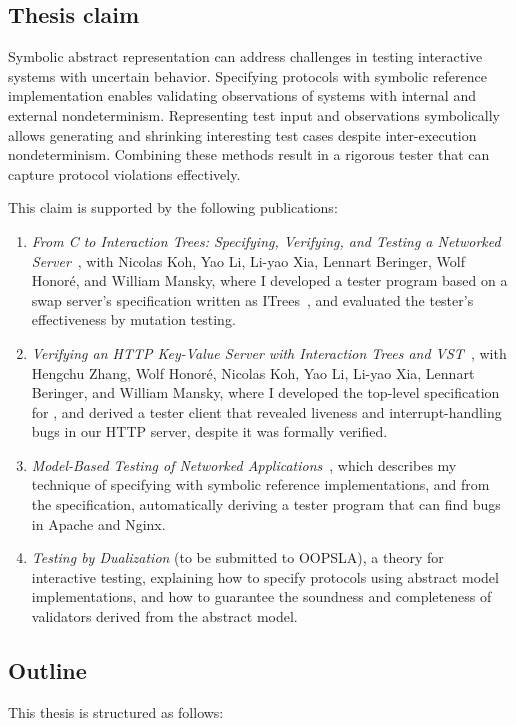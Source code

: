 \subsection*{Thesis claim}
Symbolic abstract representation can address challenges in testing interactive
systems with uncertain behavior.  Specifying protocols with symbolic reference
implementation enables validating observations of systems with internal and
external nondeterminism.  Representing test input and observations symbolically
allows generating and shrinking interesting test cases despite inter-execution
nondeterminism.  Combining these methods result in a rigorous tester that can
capture protocol violations effectively.

This claim is supported by the following publications:
\begin{enumerate}
\item {\it From C to Interaction Trees: Specifying, Verifying, and Testing a
  Networked Server}~\cite{cpp19}, with Nicolas Koh, Yao Li, Li-yao Xia, Lennart
  Beringer, Wolf Honor\'e, and William Mansky, where I developed a tester
  program based on a swap server's specification written as ITrees~\cite{itree},
  and evaluated the tester's effectiveness by mutation testing.
\item {\it Verifying an HTTP Key-Value Server with Interaction Trees and
  VST}~\cite{itp21}, with Hengchu Zhang, Wolf Honor\'e, Nicolas Koh, Yao Li,
  Li-yao Xia, Lennart Beringer, and William Mansky, where I developed the
  top-level specification for \http, and derived a tester client that revealed
  liveness and interrupt-handling bugs in our HTTP server, despite it was
  formally verified.
\item {\it Model-Based Testing of Networked Applications}~\cite{issta21}, which
  describes my technique of specifying \http with symbolic reference
  implementations, and from the specification, automatically deriving a tester
  program that can find bugs in Apache and Nginx.
\item {\it Testing by Dualization} (to be submitted to OOPSLA), a theory for
  interactive testing, explaining how to specify protocols using abstract model
  implementations, and how to guarantee the soundness and completeness of
  validators derived from the abstract model.
\end{enumerate}

\subsection*{Outline}
This thesis is structured as follows:
